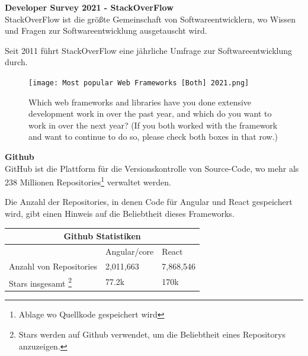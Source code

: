 \begin{flushleft}
  \textbf{Developer Survey 2021 - StackOverFlow}\\
  StackOverFlow ist die größte Gemeinschaft von Softwareentwicklern, wo Wissen und Fragen zur Softwareentwicklung ausgetauscht wird.

  Seit 2011 führt StackOverFlow eine jährliche Umfrage zur Softwareentwicklung durch.

  \begin{figure}[h]
    \centering
    \texttt{[image: Most popular Web Frameworks [Both] 2021.png]}
    \caption{ Which web frameworks and libraries have you done extensive development work in over the past year, and which do you want to work in over the next year? (If you both worked with the framework and want to continue to do so, please check both boxes in that row.) {\cite{SO01}}}

  \end{figure}
\end{flushleft}

\newpage

\begin{flushleft}
  \textbf{Github}\\
  GitHub ist die Plattform für die Versionskontrolle von Source-Code, wo mehr als 238 Millionen Repositories\footnote{Ablage wo Quellkode gespeichert wird} verwaltet werden{\cite{GH07}}.
\end{flushleft}

Die Anzahl der Repositories, in denen Code für Angular und React gespeichert wird, gibt einen Hinweis auf die Beliebtheit dieses Frameworks.
\\
\begin{table}[h!]
  \centering
  \begin{tabular}{ |p{5cm}||p{3.6cm}|p{3.6cm}|  }
    \hline
    \multicolumn{3}{|c|}{Github Statistiken}                                                                                                  \\
    \hline
                                                                                                                   & Angular/core & React     \\
    \hline
    Anzahl von     Repositories                                                                                    & 2,011,663    & 7,868,546
    \\

    \hline
    Stars insgesamt \footnote{Stars werden auf Github verwendet, um die Beliebtheit eines Repositorys anzuzeigen.} & 77.2k        & 170k
    \\
    \hline
  \end{tabular}
\end{table}

